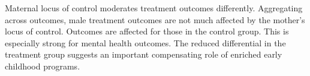 Maternal locus of control moderates treatment outcomes differently. Aggregating across outcomes, male treatment outcomes are not much affected by the mother's locus of control. Outcomes are affected for those in the control group. This is especially strong for mental health outcomes. The reduced differential in the treatment group suggests an important compensating role of enriched early childhood programs.



